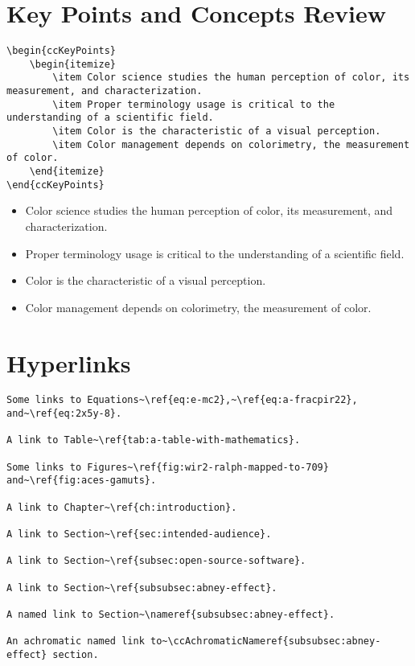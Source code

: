 \section*{Key Points and Concepts Review}%
\label{sec:key-points-and-concepts-review}

\begin{lstlisting}[caption={Key points and concepts review.}]
\begin{ccKeyPoints}
    \begin{itemize}
        \item Color science studies the human perception of color, its measurement, and characterization.
        \item Proper terminology usage is critical to the understanding of a scientific field.
        \item Color is the characteristic of a visual perception.
        \item Color management depends on colorimetry, the measurement of color.
    \end{itemize}
\end{ccKeyPoints}
\end{lstlisting}

\begin{ccKeyPoints}
    \begin{itemize}
        \item Color science studies the human perception of color, its measurement, and characterization.
        \item Proper terminology usage is critical to the understanding of a scientific field.
        \item Color is the characteristic of a visual perception.
        \item Color management depends on colorimetry, the measurement of color.
    \end{itemize}
\end{ccKeyPoints}

\section*{Hyperlinks}%
\label{sec:hyperlinks}

\begin{lstlisting}[caption={Hyperlinks.}]
Some links to Equations~\ref{eq:e-mc2},~\ref{eq:a-fracpir22}, and~\ref{eq:2x5y-8}.

A link to Table~\ref{tab:a-table-with-mathematics}.

Some links to Figures~\ref{fig:wir2-ralph-mapped-to-709} and~\ref{fig:aces-gamuts}.

A link to Chapter~\ref{ch:introduction}.

A link to Section~\ref{sec:intended-audience}.

A link to Section~\ref{subsec:open-source-software}.

A link to Section~\ref{subsubsec:abney-effect}.

A named link to Section~\nameref{subsubsec:abney-effect}.

An achromatic named link to~\ccAchromaticNameref{subsubsec:abney-effect} section.
\end{lstlisting}

